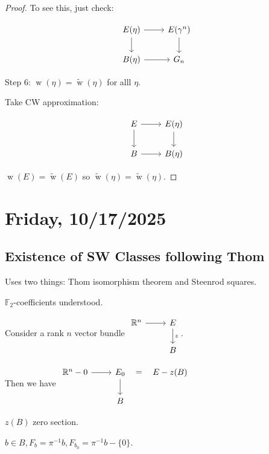 \documentclass{article}
\theoremstyle{definition}
\begin{document}
\begin{proof}
        To see this, just check:

        \[
            \begin{tikzcd}
                E(\eta) \ar[r] \ar[d] & E(\gamma^n) \ar[d] \\ B(\eta) \ar[r] & G_n
            \end{tikzcd}
        \]

        Step 6: \(\operatorname{w} (\eta) = \widetilde{\operatorname{w}} (\eta)\) for alll \(\eta\).

        Take CW approximation:

        \[
            \begin{tikzcd}
                E \ar[r] \ar[d] & E(\eta) \ar[d] \\ B \ar[r] & B(\eta)
            \end{tikzcd}
        \]

        \(\operatorname{w} (E) = \widetilde{\operatorname{w}} (E)\) so \(\widetilde{\operatorname{w}} (\eta) = \widetilde{\operatorname{w}} (\eta)\). 
    \end{proof}

    \section*{Friday, 10/17/2025}
    
    \subsection*{Existence of SW Classes following Thom}

    Uses two things: Thom isomorphism theorem and Steenrod squares.

    \(\mathbb{F}_2\)-coefficients understood.

    Consider a rank \(n\) vector bundle \(\begin{tikzcd}
        \mathbb{R}^n \ar[r] & E \ar[d,"z"] \\ & B
    \end{tikzcd}\).

    Then we have \(\begin{tikzcd}
        \mathbb{R}^n - 0 \ar[r] & E_0 \ar[d] \ar[r,"=", phantom] & E - z(B) \\ & B
    \end{tikzcd}\) 

    \(z(B)\) zero section.

    \(b\in B, F_b = \pi ^{-1} b, F_{b_0} = \pi ^{-1} b - \{ 0 \}\).
\end{document}
